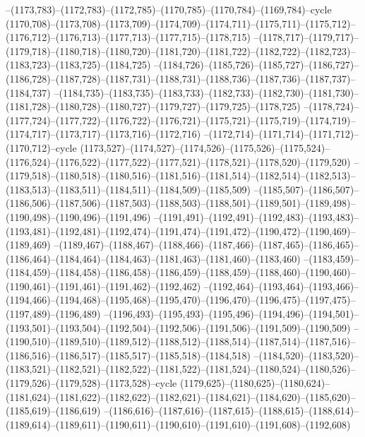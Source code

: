 --(1173,783)--(1172,783)--(1172,785)--(1170,785)--(1170,784)--(1169,784)--cycle
(1170,708)--(1173,708)--(1173,709)--(1174,709)--(1174,711)--(1175,711)--(1175,712)--(1176,712)--(1176,713)--(1177,713)--(1177,715)--(1178,715)
--(1178,717)--(1179,717)--(1179,718)--(1180,718)--(1180,720)--(1181,720)--(1181,722)--(1182,722)--(1182,723)--(1183,723)--(1183,725)--(1184,725)
--(1184,726)--(1185,726)--(1185,727)--(1186,727)--(1186,728)--(1187,728)--(1187,731)--(1188,731)--(1188,736)--(1187,736)--(1187,737)--(1184,737)
--(1184,735)--(1183,735)--(1183,733)--(1182,733)--(1182,730)--(1181,730)--(1181,728)--(1180,728)--(1180,727)--(1179,727)--(1179,725)--(1178,725)
--(1178,724)--(1177,724)--(1177,722)--(1176,722)--(1176,721)--(1175,721)--(1175,719)--(1174,719)--(1174,717)--(1173,717)--(1173,716)--(1172,716)
--(1172,714)--(1171,714)--(1171,712)--(1170,712)--cycle
(1173,527)--(1174,527)--(1174,526)--(1175,526)--(1175,524)--(1176,524)--(1176,522)--(1177,522)--(1177,521)--(1178,521)--(1178,520)--(1179,520)
--(1179,518)--(1180,518)--(1180,516)--(1181,516)--(1181,514)--(1182,514)--(1182,513)--(1183,513)--(1183,511)--(1184,511)--(1184,509)--(1185,509)
--(1185,507)--(1186,507)--(1186,506)--(1187,506)--(1187,503)--(1188,503)--(1188,501)--(1189,501)--(1189,498)--(1190,498)--(1190,496)--(1191,496)
--(1191,491)--(1192,491)--(1192,483)--(1193,483)--(1193,481)--(1192,481)--(1192,474)--(1191,474)--(1191,472)--(1190,472)--(1190,469)--(1189,469)
--(1189,467)--(1188,467)--(1188,466)--(1187,466)--(1187,465)--(1186,465)--(1186,464)--(1184,464)--(1184,463)--(1181,463)--(1181,460)--(1183,460)
--(1183,459)--(1184,459)--(1184,458)--(1186,458)--(1186,459)--(1188,459)--(1188,460)--(1190,460)--(1190,461)--(1191,461)--(1191,462)--(1192,462)
--(1192,464)--(1193,464)--(1193,466)--(1194,466)--(1194,468)--(1195,468)--(1195,470)--(1196,470)--(1196,475)--(1197,475)--(1197,489)--(1196,489)
--(1196,493)--(1195,493)--(1195,496)--(1194,496)--(1194,501)--(1193,501)--(1193,504)--(1192,504)--(1192,506)--(1191,506)--(1191,509)--(1190,509)
--(1190,510)--(1189,510)--(1189,512)--(1188,512)--(1188,514)--(1187,514)--(1187,516)--(1186,516)--(1186,517)--(1185,517)--(1185,518)--(1184,518)
--(1184,520)--(1183,520)--(1183,521)--(1182,521)--(1182,522)--(1181,522)--(1181,524)--(1180,524)--(1180,526)--(1179,526)--(1179,528)--(1173,528)--cycle
(1179,625)--(1180,625)--(1180,624)--(1181,624)--(1181,622)--(1182,622)--(1182,621)--(1184,621)--(1184,620)--(1185,620)--(1185,619)--(1186,619)
--(1186,616)--(1187,616)--(1187,615)--(1188,615)--(1188,614)--(1189,614)--(1189,611)--(1190,611)--(1190,610)--(1191,610)--(1191,608)--(1192,608)
